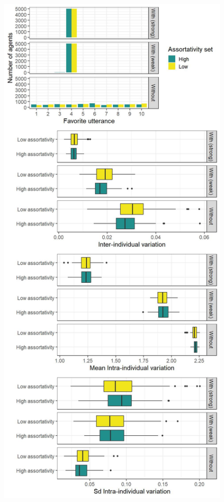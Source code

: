 \documentclass[
]{article}
\begin{document}
\begin{figure}[!H]

{\centering \includegraphics{./Figures/unnamed-chunk-10-1} 

}


\end{figure}
\end{document}
